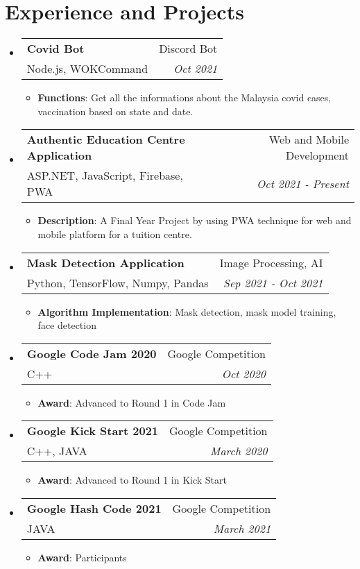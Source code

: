 \documentclass[a4paper, 12pt]{article}
\makeatletter
\newcommand{\resumeItem}[2]{
  \item\small{
    \textbf{\textsf{#1}}{: \textsf{#2} \vspace{-2pt}}
  }
}
\newcommand{\resumeSubheading}[4]{
  \vspace{-1pt}\item
    \begin{tabular*}{0.97\textwidth}[t]{l@{\extracolsep{\fill}}r}
      \textbf{\textsf{#1}} & \textsf{#2} \\
      \textsf{\small{#3}} & \textit{\textsf{\small{#4}}} \\
    \end{tabular*}\vspace{-5pt}
}
\newcommand{\resumeSubHeadingListStart}{\begin{itemize}[leftmargin=*]}
\newcommand{\resumeSubHeadingListEnd}{\end{itemize}}
\newcommand{\resumeItemListStart}{\begin{itemize}}
\newcommand{\resumeItemListEnd}{\end{itemize}\vspace{-5pt}}
\makeatother
\begin{document}
\section{Experience and Projects}
    \resumeSubHeadingListStart
        \resumeSubheading
        {Covid Bot}{Discord Bot}
        {Node.js, WOKCommand}{Oct 2021}
            \resumeItemListStart
                \resumeItem{Functions}
                {Get all the informations about the Malaysia covid cases, vaccination based on state and date.}
            \resumeItemListEnd
    
    \vspace{5px}
    \resumeSubheading
        {Authentic Education Centre Application}{Web and Mobile Development}
        {ASP.NET, JavaScript, Firebase, PWA}{Oct 2021 - Present}
            \resumeItemListStart
                \resumeItem{Description}
                {A Final Year Project by using PWA technique for web and mobile platform for a tuition centre.}
            \resumeItemListEnd

    \vspace{5px}
    \resumeSubheading
        {Mask Detection Application}{Image Processing, AI}
        {Python, TensorFlow, Numpy, Pandas}{Sep 2021 - Oct 2021}
            \resumeItemListStart
                \resumeItem{Algorithm Implementation}
                {Mask detection, mask model training, face detection}
            \resumeItemListEnd
            
    \vspace{5px}
    \resumeSubheading
        {Google Code Jam 2020}{Google Competition}
        {C++}{Oct 2020}
            \resumeItemListStart
                \resumeItem{Award}
                {Advanced to Round 1 in Code Jam}
            \resumeItemListEnd
            
    \vspace{5px}
    \resumeSubheading
        {Google Kick Start 2021}{Google Competition}
        {C++, JAVA}{March 2020}
            \resumeItemListStart
                \resumeItem{Award}
                {Advanced to Round 1 in Kick Start}
            \resumeItemListEnd
            
    \vspace{5px}
    \resumeSubheading
        {Google Hash Code 2021}{Google Competition}
        {JAVA}{March 2021}
            \resumeItemListStart
                \resumeItem{Award}
                {Participants}
            \resumeItemListEnd
\resumeSubHeadingListEnd

\vspace{-5pt}
\end{document}
